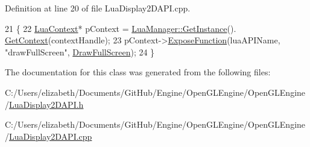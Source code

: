 Definition at line 20 of file Lua\+Display2\+D\+A\+P\+I.\+cpp.


\begin{DoxyCode}
21 \{
22     \hyperlink{class_lua_context}{LuaContext}* pContext = \hyperlink{class_singleton_a74f32751d99bf3cc95fe17aba11f4b07}{LuaManager::GetInstance}().
      \hyperlink{class_lua_manager_a68592b46a59219d130cf4f637c977378}{GetContext}(contextHandle);
23     pContext->\hyperlink{class_lua_context_a2229908b6b329ed67105f1be7409cb3f}{ExposeFunction}(luaAPIName, \textcolor{stringliteral}{"drawFullScreen"}, 
      \hyperlink{class_lua_display2_d_a_p_i_a766e83bd46fa7810acec8f6b079709f0}{DrawFullScreen});
24 \}
\end{DoxyCode}


The documentation for this class was generated from the following files\+:\begin{DoxyCompactItemize}
\item 
C\+:/\+Users/elizabeth/\+Documents/\+Git\+Hub/\+Engine/\+Open\+G\+L\+Engine/\+Open\+G\+L\+Engine/\hyperlink{_lua_display2_d_a_p_i_8h}{Lua\+Display2\+D\+A\+P\+I.\+h}\item 
C\+:/\+Users/elizabeth/\+Documents/\+Git\+Hub/\+Engine/\+Open\+G\+L\+Engine/\+Open\+G\+L\+Engine/\hyperlink{_lua_display2_d_a_p_i_8cpp}{Lua\+Display2\+D\+A\+P\+I.\+cpp}\end{DoxyCompactItemize}
